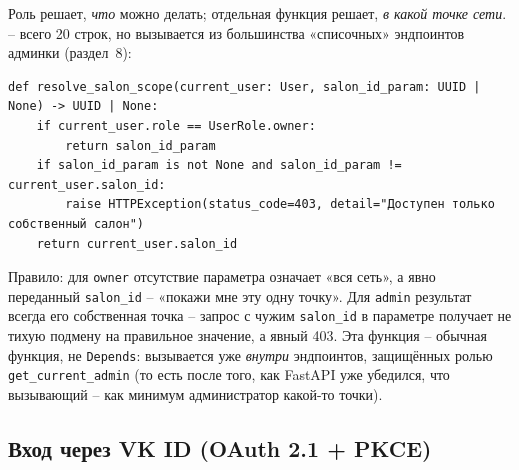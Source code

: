 Роль решает, \emph{что} можно делать; отдельная функция решает, \emph{в
какой точке сети}.  --
всего 20 строк, но вызывается из большинства «списочных» эндпоинтов
админки (раздел~8):
\begin{verbatim}
def resolve_salon_scope(current_user: User, salon_id_param: UUID | None) -> UUID | None:
    if current_user.role == UserRole.owner:
        return salon_id_param
    if salon_id_param is not None and salon_id_param != current_user.salon_id:
        raise HTTPException(status_code=403, detail="Доступен только собственный салон")
    return current_user.salon_id
\end{verbatim}
Правило: для \texttt{owner} отсутствие параметра означает «вся сеть», а
явно переданный \texttt{salon_id} -- «покажи мне эту одну точку». Для
\texttt{admin} результат всегда его собственная точка -- запрос с чужим
\texttt{salon_id} в параметре получает не тихую подмену на правильное
значение, а явный 403. Эта функция -- обычная функция, не
\texttt{Depends}: вызывается уже \emph{внутри} эндпоинтов, защищённых
ролью \texttt{get_current_admin} (то есть после того, как FastAPI уже
убедился, что вызывающий -- как минимум администратор какой-то точки).

\subsection{Вход через VK ID (OAuth 2.1 + PKCE)}


